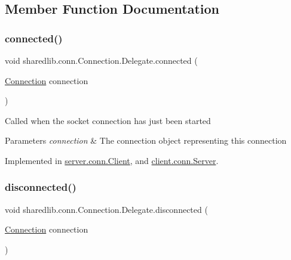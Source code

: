\subsection{Member Function Documentation}
\hypertarget{interfacesharedlib_1_1conn_1_1_connection_1_1_delegate_acb701b2d46601fd448eba6c79b82694d}{}\label{interfacesharedlib_1_1conn_1_1_connection_1_1_delegate_acb701b2d46601fd448eba6c79b82694d} 
\subsubsection{\texorpdfstring{connected()}{connected()}}
{\footnotesize\ttfamily void sharedlib.\+conn.\+Connection.\+Delegate.\+connected (\begin{DoxyParamCaption}\item[{\hyperlink{classsharedlib_1_1conn_1_1_connection}{Connection}}]{connection }\end{DoxyParamCaption})}

Called when the socket connection has just been started


\begin{DoxyParams}{Parameters}
{\em connection} & The connection object representing this connection \\
\hline
\end{DoxyParams}


Implemented in \hyperlink{classserver_1_1conn_1_1_client_a9c86594158e4eb8e09159567dd94f6ce}{server.\+conn.\+Client}, and \hyperlink{classclient_1_1conn_1_1_server_ac8ad09c9052bfb32e082493ada8d14ab}{client.\+conn.\+Server}.

\hypertarget{interfacesharedlib_1_1conn_1_1_connection_1_1_delegate_a64e49ea25180c770c2cbc1953fd79fed}{}\label{interfacesharedlib_1_1conn_1_1_connection_1_1_delegate_a64e49ea25180c770c2cbc1953fd79fed} 
\subsubsection{\texorpdfstring{disconnected()}{disconnected()}}
{\footnotesize\ttfamily void sharedlib.\+conn.\+Connection.\+Delegate.\+disconnected (\begin{DoxyParamCaption}\item[{\hyperlink{classsharedlib_1_1conn_1_1_connection}{Connection}}]{connection }\end{DoxyParamCaption})}

